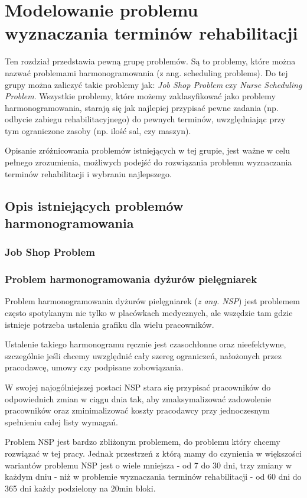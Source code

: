 


\chapter{Modelowanie problemu wyznaczania terminów rehabilitacji}
Ten rozdział przedstawia pewną grupę problemów. Są to problemy,
które można nazwać problemami harmonogramowania (z ang. scheduling problems).
Do tej grupy można zaliczyć takie problemy jak: \emph{Job Shop Problem} czy
\emph{Nurse Scheduling Problem}. Wszystkie problemy, które możemy zaklasyfikować
jako problemy harmonogramowania, starają się jak najlepiej przypisać pewne
zadania (np. odbycie zabiegu rehabilitacyjnego) do pewnych terminów, uwzględniając przy tym ograniczone zasoby (np. ilość
sal, czy maszyn).

Opisanie zróżnicowania problemów istniejących w tej grupie, jest ważne w celu pełnego
zrozumienia, możliwych podejść do rozwiązania problemu wyznaczania
terminów rehabilitacji i wybraniu najlepszego.

\section{Opis istniejących problemów harmonogramowania}
\subsection{Job Shop Problem}
\subsection{Problem harmonogramowania dyżurów pielęgniarek}
Problem harmonogramowania dyżurów pielęgniarek\cite{nurseScheduling} (\emph{z ang. NSP}) jest problemem często spotykanym nie tylko w placówkach medycznych, ale
wszędzie tam gdzie istnieje potrzeba ustalenia grafiku dla wielu pracowników.

Ustalenie takiego harmonogramu ręcznie jest czasochłonne oraz nieefektywne,
szczególnie jeśli chcemy uwzględnić cały szereg ograniczeń, nałożonych przez
pracodawcę, umowy czy podpisane zobowiązania.

W swojej najogólniejszej postaci NSP stara się przypisać pracowników do
odpowiednich zmian w ciągu dnia tak, aby zmaksymalizować zadowolenie pracowników
oraz zminimalizować koszty pracodawcy przy jednoczesnym spełnieniu całej listy
wymagań.

Problem NSP jest bardzo zbliżonym problemem, do problemu który chcemy rozwiązać
w tej pracy. Jednak przestrzeń z którą mamy do czynienia w większości wariantów problemu NSP jest o wiele mniejsza - od 7 do 30 dni, trzy zmiany w każdym dniu - niż w problemie wyznaczania terminów rehabilitacji - od 60 dni do 365 dni każdy podzielony na 20min bloki.

